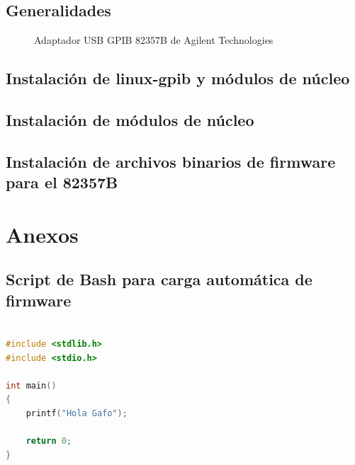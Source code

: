 \documentclass[paper=letter,oneside,fontsize=11pt, parskip=full]{scrartcl}
\begin{document}
		\subsection{Generalidades}
				
		\begin{figure}[!h]
			\begin{center}
				\caption{Adaptador USB GPIB 82357B de Agilent Technologies}
				\label{Fig:AdaptadorGpibUsb}
			\end{center}
		\end{figure}	
		
	
		

	
		\subsection{Instalación de linux-gpib y módulos de núcleo}		
		
		\subsection{Instalación de módulos de núcleo}	
		
		\subsection{Instalación de archivos binarios de firmware para el 82357B}	

			
	\section{Anexos}	
		
		\subsection{Script de Bash para carga automática de firmware}
	
			\begin{lstlisting}[language=c,caption={Listado programa}]
	
#include <stdlib.h>
#include <stdio.h>

int main()
{
	printf("Hola Gafo");
	
	return 0;
}

		\end{lstlisting}
\end{document}

